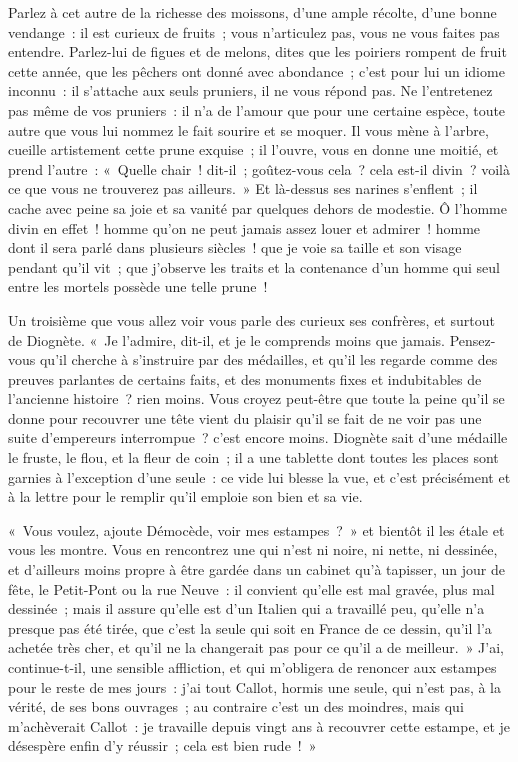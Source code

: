 \documentclass[french,twoside]{book} %
\begin{document}
Parlez à cet autre de la richesse des moissons, d’une ample récolte, d’une bonne vendange : il est curieux de fruits ; vous n’articulez pas, vous ne vous faites pas entendre. Parlez-lui de figues et de melons, dites que les poiriers rompent de fruit cette année, que les pêchers ont donné avec abondance ; c’est pour lui un idiome inconnu : il s’attache aux seuls pruniers, il ne vous répond pas. Ne l’entretenez pas même de vos pruniers : il n’a de l’amour que pour une certaine espèce, toute autre que vous lui nommez le fait sourire et se moquer. Il vous mène à l’arbre, cueille artistement cette prune exquise ; il l’ouvre, vous en donne une moitié, et prend l’autre : « Quelle chair ! dit-il ; goûtez-vous cela ? cela est-il divin ? voilà ce que vous ne trouverez pas ailleurs. » Et là-dessus ses narines s’enflent ; il cache avec peine sa joie et sa vanité par quelques dehors de modestie. Ô l’homme divin en effet ! homme qu’on ne peut jamais assez louer et admirer ! homme dont il sera parlé dans plusieurs siècles ! que je voie sa taille et son visage pendant qu’il vit ; que j’observe les traits et la contenance d’un homme qui seul entre les mortels possède une telle prune !\par
Un troisième que vous allez voir vous parle des curieux ses confrères, et surtout de Diognète. « Je l’admire, dit-il, et je le comprends moins que jamais. Pensez-vous qu’il cherche à s’instruire par des médailles, et qu’il les regarde comme des preuves parlantes de certains faits, et des monuments fixes et indubitables de l’ancienne histoire ? rien moins. Vous croyez peut-être que toute la peine qu’il se donne pour recouvrer une tête vient du plaisir qu’il se fait de ne voir pas une suite d’empereurs interrompue ? c’est encore moins. Diognète sait d’une médaille le fruste, le flou, et la fleur de coin ; il a une tablette dont toutes les places sont garnies à l’exception d’une seule : ce vide lui blesse la vue, et c’est précisément et à la lettre pour le remplir qu’il emploie son bien et sa vie.\par
« Vous voulez, ajoute Démocède, voir mes estampes ? » et bientôt il les étale et vous les montre. Vous en rencontrez une qui n’est ni noire, ni nette, ni dessinée, et d’ailleurs moins propre à être gardée dans un cabinet qu’à tapisser, un jour de fête, le Petit-Pont ou la rue Neuve : il convient qu’elle est mal gravée, plus mal dessinée ; mais il assure qu’elle est d’un Italien qui a travaillé peu, qu’elle n’a presque pas été tirée, que c’est la seule qui soit en France de ce dessin, qu’il l’a achetée très cher, et qu’il ne la changerait pas pour ce qu’il a de meilleur. » J'ai, continue-t-il, une sensible affliction, et qui m’obligera de renoncer aux estampes pour le reste de mes jours : j’ai tout Callot, hormis une seule, qui n’est pas, à la vérité, de ses bons ouvrages ; au contraire c’est un des moindres, mais qui m’achèverait Callot : je travaille depuis vingt ans à recouvrer cette estampe, et je désespère enfin d’y réussir ; cela est bien rude ! »\par
\end{document}
